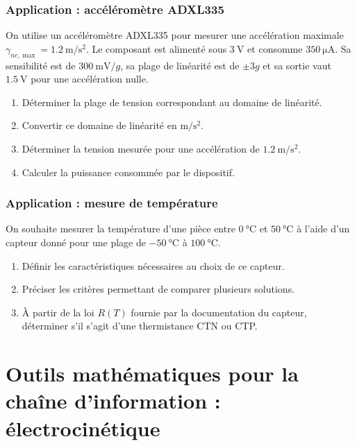 \subsubsection{Application : accéléromètre ADXL335}

On utilise un accéléromètre ADXL335 pour mesurer une accélération maximale $\gamma_{nc,\max}=\SI{1.2}{\metre\per\second\squared}$. Le composant est alimenté sous $\SI{3}{\volt}$ et consomme $\SI{350}{\micro\ampere}$. Sa sensibilité est de $\SI{300}{\milli\volt\per g}$, sa plage de linéarité est de $\pm 3g$ et sa sortie vaut $\SI{1.5}{\volt}$ pour une accélération nulle.

\begin{enumerate}
  \item Déterminer la plage de tension correspondant au domaine de linéarité.
  \item Convertir ce domaine de linéarité en $\si{\metre\per\second\squared}$.
  \item Déterminer la tension mesurée pour une accélération de $\SI{1.2}{\metre\per\second\squared}$.
  \item Calculer la puissance consommée par le dispositif.
\end{enumerate}

\subsubsection{Application : mesure de température}

On souhaite mesurer la température d'une pièce entre $\SI{0}{\degreeCelsius}$ et $\SI{50}{\degreeCelsius}$ à l'aide d'un capteur donné pour une plage de $-\SI{50}{\degreeCelsius}$ à $\SI{100}{\degreeCelsius}$.

\begin{enumerate}
  \item Définir les caractéristiques nécessaires au choix de ce capteur.
  \item Préciser les critères permettant de comparer plusieurs solutions.
  \item À partir de la loi $R(T)$ fournie par la documentation du capteur, déterminer s'il s'agit d'une thermistance CTN ou CTP.
\end{enumerate}

\section{Outils mathématiques pour la chaîne d'information : électrocinétique}\label{sec:elec-electrocinetique}

